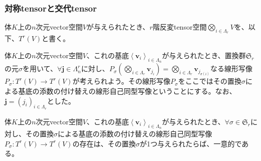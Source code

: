 \documentclass[dvipdfmx]{jsarticle}
\begin{document}
\subsubsection{対称tensorと交代tensor}%
\begin{dfn}
体$K$上の$n$次元vector空間$V$が与えられたとき、$r$階反変tensor空間$\bigotimes_{i \in \varLambda_{r}} V$を、以下、$T^{r}(V)$と書く。
\end{dfn}
\begin{dfn}
体$K$上の$n$次元vector空間$V$、これの基底$\left\langle \mathbf{v}_{i} \right\rangle_{i \in \varLambda_{n}}$が与えられたとき、置換群$\mathfrak{S}_{r}$の元$\sigma$を用いて、$\forall\mathbf{j} \in \varLambda_{n}^{r}$に対し、$P_{\sigma}\left( \bigotimes_{i \in \varLambda_{r}} \mathbf{v}_{j_{i}} \right) = \bigotimes_{i \in \varLambda_{r}} \mathbf{v}_{j_{\sigma(i)}}$なる線形写像$P_{\sigma}:T^{r}(V) \rightarrow T^{r}(V)$が考えられよう。その線形写像$P_{\sigma}$をここではその置換$\sigma$による基底の添数の付け替えの線形自己同型写像ということにする。なお、$\mathbf{j}=\left( j_{i} \right)_{i \in \varLambda_{r}}$とした。
\end{dfn}
\begin{thm}\label{2.4.8.3}
体$K$上の$n$次元vector空間$V$、これの基底$\left\langle \mathbf{v}_{i} \right\rangle_{i \in \varLambda_{n}}$が与えられたとき、$\forall\sigma \in \mathfrak{S}_{r}$に対し、その置換$\sigma$による基底の添数の付け替えの線形自己同型写像$P_{\sigma}:T^{r}(V) \rightarrow T^{r}(V)$の存在は、その置換$\sigma$が1つ与えられたらば、一意的である。
\end{thm}
\end{document}

